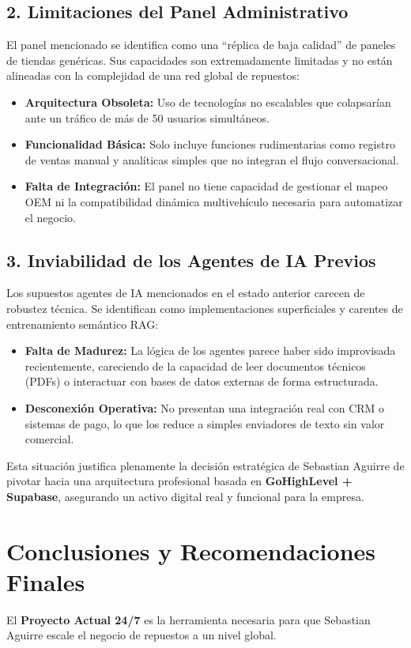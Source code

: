 \documentclass[12pt,a4paper]{article}
\begin{document}
\subsection{2. Limitaciones del Panel Administrativo}
El panel mencionado se identifica como una ``réplica de baja calidad'' de paneles de tiendas genéricas. Sus capacidades son extremadamente limitadas y no est\'an alineadas con la complejidad de una red global de repuestos:
\begin{itemize}
    \item \textbf{Arquitectura Obsoleta:} Uso de tecnologías no escalables que colapsarían ante un tráfico de más de 50 usuarios simultáneos.
    \item \textbf{Funcionalidad Básica:} Solo incluye funciones rudimentarias como registro de ventas manual y analíticas simples que no integran el flujo conversacional.
    \item \textbf{Falta de Integración:} El panel no tiene capacidad de gestionar el mapeo OEM ni la compatibilidad din\'amica multivehículo necesaria para automatizar el negocio.
\end{itemize}

\subsection{3. Inviabilidad de los Agentes de IA Previos}
Los supuestos agentes de IA mencionados en el estado anterior carecen de robustez t\'ecnica. Se identifican como implementaciones superficiales y carentes de entrenamiento semántico RAG:
\begin{itemize}
    \item \textbf{Falta de Madurez:} La lógica de los agentes parece haber sido improvisada recientemente, careciendo de la capacidad de leer documentos t\'ecnicos (PDFs) o interactuar con bases de datos externas de forma estructurada.
    \item \textbf{Desconexión Operativa:} No presentan una integraci\'on real con CRM o sistemas de pago, lo que los reduce a simples enviadores de texto sin valor comercial.
\end{itemize}

Esta situaci\'on justifica plenamente la decisi\'on estrat\'egica de Sebastian Aguirre de pivotar hacia una arquitectura profesional basada en \textbf{GoHighLevel + Supabase}, asegurando un activo digital real y funcional para la empresa.

\newpage

\section{Conclusiones y Recomendaciones Finales}
El \textbf{Proyecto Actual 24/7} es la herramienta necesaria para que Sebastian Aguirre escale el negocio de repuestos a un nivel global. 
\end{document}

